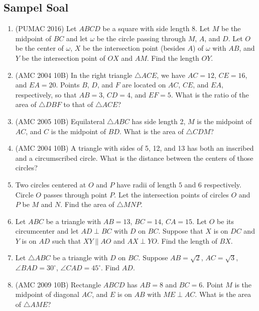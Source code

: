 \documentclass[12pt]{scrartcl}
\begin{document}
\subsection{Sampel Soal}
\begin{enumerate}
    \item (PUMAC 2016) Let $ABCD$ be a square with side length 8. Let $M$ be the midpoint of $BC$ and let $\omega$ be the circle passing through $M$, $A$, and $D$. Let $O$ be the center of $\omega$, $X$ be the intersection point (besides $A$) of $\omega$ with $AB$, and $Y$ be the intersection point of $OX$ and $AM$. Find the length $OY$.

    \item (AMC 2004 10B) In the right triangle $\triangle ACE$, we have $AC = 12$, $CE = 16$, and $EA = 20$. Points $B$, $D$, and $F$ are located on $AC$, $CE$, and $EA$, respectively, so that $AB = 3$, $CD = 4$, and $EF = 5$. What is the ratio of the area of $\triangle DBF$ to that of $\triangle ACE$?

    \item (AMC 2005 10B) Equilateral $\triangle ABC$ has side length 2, $M$ is the midpoint of $AC$, and $C$ is the midpoint of $BD$. What is the area of $\triangle CDM$?

    \item (AMC 2004 10B) A triangle with sides of 5, 12, and 13 has both an inscribed and a circumscribed circle. What is the distance between the centers of those circles?

    \item Two circles centered at $O$ and $P$ have radii of length $5$ and $6$ respectively. Circle $O$ passes through point $P$. Let the intersection points of circles $O$ and $P$ be $M$ and $N$. Find the area of $\triangle MNP$.

    \item Let $ABC$ be a triangle with $AB = 13$, $BC = 14$, $CA = 15$. Let $O$ be its circumcenter and let $AD \perp BC$ with $D$ on $BC$. Suppose that $X$ is on $DC$ and $Y$ is on $AD$ such that $XY \parallel AO$ and $AX \perp YO$. Find the length of $BX$.

    \item Let $\triangle ABC$ be a triangle with $D$ on $BC$. Suppose $AB = \sqrt{2}$, $AC = \sqrt{3}$, $\angle BAD = 30^\circ$, $\angle CAD = 45^\circ$. Find $AD$.

    \item (AMC 2009 10B) Rectangle $ABCD$ has $AB = 8$ and $BC = 6$. Point $M$ is the midpoint of diagonal $AC$, and $E$ is on $AB$ with $ME \perp AC$. What is the area of $\triangle AME$?



\end{enumerate}
\end{document}
